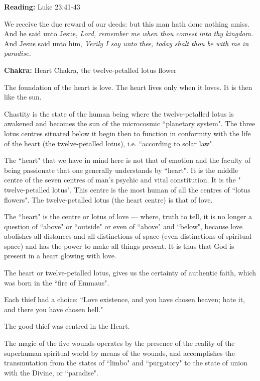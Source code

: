 \textbf{Reading:} Luke 23:41-43


\begin{quotex}
We receive the due reward of our deeds: but this man hath done nothing amiss. And he said unto Jesus, \textit{Lord, remember me when thou comest into thy kingdom.} And Jesus said unto him, \textit{Verily I say unto thee, today shalt thou be with me in paradise.}

\end{quotex}

\textbf{Chakra:} Heart Chakra, the twelve-petalled lotus flower

\begin{quotex}
The foundation of the heart is love. The heart lives only when it loves. It is then like the sun.

Chastity is the state of the human being where the twelve-petalled lotus is awakened and becomes the sun of the microcosmic ``planetary system". The three lotus centres situated below it begin then to function in conformity with the life of the heart (the twelve-petalled lotus), i.e. ``according to solar law".

The ``heart" that we have in mind here is not that of emotion and the faculty of being passionate that one generally understands by ``heart". It is the middle centre of the seven centres of man's psychic and vital constitution. It is the " twelve-petalled lotus". This centre is the most human of all the centres of ``lotus flowers". The twelve-petalled lotus (the heart centre) is that of love.

The ``heart" is the centre or lotus of love — where, truth to tell, it is no longer a question of ``above" or ``outside" or even of ``above" and ``below", because love abolishes all distances and all distinctions of space (even distinctions of spiritual space) and has the power to make all things present. It is thus that God is present in a heart glowing with love.

The heart or twelve-petalled lotus, gives us the certainty of authentic faith, which was born in the ``fire of Emmaus". 

\end{quotex}
Each thief had a choice: ``Love existence, and you have chosen heaven; hate it, and there you have chosen hell."

The good thief was centred in the Heart.

The magic of the five wounds operates by the presence of the reality of the superhuman spiritual world by means of the wounds, and accomplishes the transmutation from the states of ``limbo" and ``purgatory" to the state of union with the Divine, or ``paradise".


